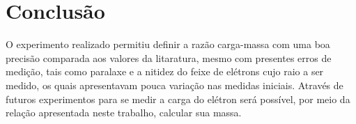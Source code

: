 \section{Conclusão}
O experimento realizado permitiu definir a razão carga-massa com uma boa precisão comparada aos valores da litaratura, mesmo com presentes erros de medição, tais como paralaxe e a nitidez do feixe de elétrons cujo raio a ser medido, os quais apresentavam pouca variação nas medidas iniciais. Através de futuros experimentos para se medir a carga do elétron será possível, por meio da relação apresentada neste trabalho, calcular sua massa.  
